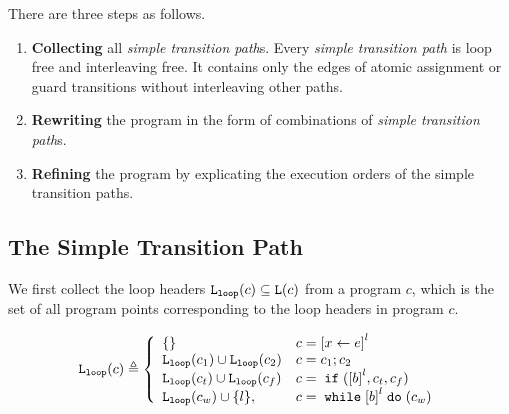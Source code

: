 There are three steps as follows.
\begin{enumerate}
 \item \textbf{Collecting} all \emph{simple transition path}s.
 Every \emph{simple transition path} is loop free and interleaving free. It
 contains only the edges of atomic assignment or guard transitions without interleaving other paths.
 \item \textbf{Rewriting} the program in the form of combinations of \emph{simple transition path}s.
 \item \textbf{Refining} the program 
 by explicating the execution orders of the simple transition paths.
\end{enumerate}

\subsection{The Simple Transition Path}
We first collect the loop headers $\mathtt{L}_{\mathtt{loop}}(c) \subseteq \mathtt{L}(c)$ from a program $c$, which is the set of all program points corresponding to the loop headers in program $c$.
\begin{defn}
 \label{def:loopl}
 \[
 \loopl(c) \triangleq 
 \left\{
 \begin{array}{ll}
 \{\} & {c} = \clabel{\assign x e}^{l} \\
 \loopl({c_1}) \cup \loopl({{c_2}}) & {c} = {c_1};{c_2} \\
 \loopl(c_t) \cup \loopl({{c_f}}) & {c} =\eif(\clabel{\bexpr}^{l}, c_t, c_f) \\
 \loopl(c_w) \cup \{l\}, & {c} = \ewhile \clabel{\bexpr}^{l} \edo (c_w)
 \end{array}
\right.
\]
 \end{defn}

